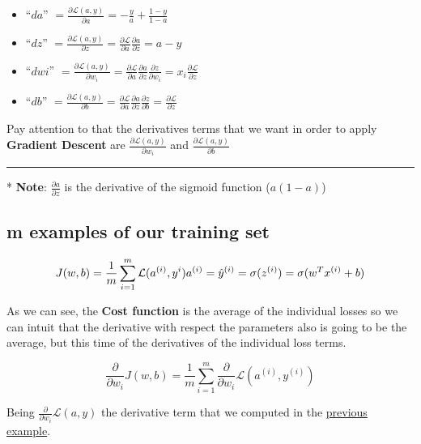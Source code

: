 \documentclass[
]{book}
\providecommand{\tightlist}{%
  \setlength{\itemsep}{0pt}\setlength{\parskip}{0pt}}
\begin{document}
\begin{itemize}
\tightlist
\item
  ``\(da\)'' \(= \frac{\partial \mathcal{L}(a,y)}{\partial a} = - \frac{y}{a} + \frac{1-y}{1-a}\)
\item
  ``\(dz\)'' \(= \frac{\partial \mathcal{L}(a,y)}{\partial z} = \frac{\partial \mathcal{L}}{\partial a} \frac{\partial a}{\partial z} = a - y\)
\item
  ``\(dwi\)'' \(= \frac{\partial \mathcal{L}(a,y)}{\partial w_i} = \frac{\partial \mathcal{L}}{\partial a} \frac{\partial a}{\partial z} \frac{\partial z}{\partial w_i} = x_i \frac{\partial \mathcal{L}}{\partial z}\)
\item
  ``\(db\)'' \(= \frac{\partial \mathcal{L}(a,y)}{\partial b} = \frac{\partial \mathcal{L}}{\partial a} \frac{\partial a}{\partial z} \frac{\partial z}{\partial b} = \frac{\partial \mathcal{L}}{\partial z}\)
\end{itemize}

Pay attention to that the derivatives terms that we want in order to apply \textbf{Gradient Descent} are \(\frac{\partial \mathcal{L}(a,y)}{\partial w_i}\) and \(\frac{\partial \mathcal{L}(a,y)}{\partial b}\)

\begin{center}\rule{0.5\linewidth}{0.5pt}\end{center}

* \textbf{Note}: \(\frac{\partial a}{\partial z}\) is the derivative of the sigmoid function (\(a(1-a)\))

\hypertarget{m-examples-of-our-training-set}{%
\subsection{m examples of our training set}\label{m-examples-of-our-training-set}}

\[
J(w,b) = \frac{1}{m} \sum^m_{i=1} \mathcal{L}(a^{(i)},y^{i})\\
a^{(i)} = \hat{y}^{(i)} = \sigma (z^{(i)}) = \sigma (w^Tx^{(i)} + b)
\]

As we can see, the \textbf{Cost function} is the average of the individual losses so we can intuit that the derivative with respect the parameters also is going to be the average, but this time of the derivatives of the individual loss terms.

\[
\frac{\partial}{\partial w_i}J(w,b) = \frac{1}{m} \sum^m_{i=1}\frac{\partial}{\partial w_i} \mathcal{L}(a^{(i)},y^{(i)})
\]

Being \(\frac{\partial}{\partial w_i}\mathcal{L}(a,y)\) the derivative term that we computed in the \protect\hyperlink{one-example}{previous example}.
\end{document}
